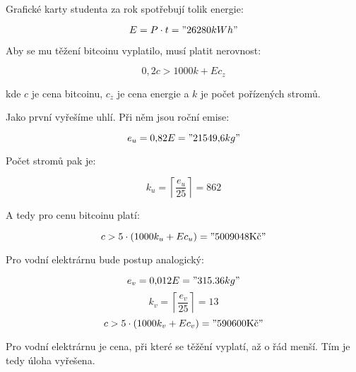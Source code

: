 \documentclass{fkssolpub}
\author{Ondřej Sedláček}
\begin{document}
Grafické karty studenta za rok spotřebují tolik energie:

\[
	E = P \cdot t = "26280 kWh"
\]

Aby se mu těžení bitcoinu vyplatilo, musí platit nerovnost:

\[
	0{,}2 c > 1000 k + E c_z
\]

kde $c$ je cena bitcoinu, $c_z$ je cena energie a $k$ je počet pořízených stromů.

Jako první vyřešíme uhlí. Při něm jsou roční emise:

\[
	e_u = 0{,}82 E = "21549{,}6 kg"
\]

Počet stromů pak je:

\[
	k_u = \left\lceil \frac{e_u}{25} \right\rceil = 862
\]

A tedy pro cenu bitcoinu platí:

\[
	c > 5 \cdot (1000 k_u + E c_u) = "5009048 \text{Kč}"
\]

Pro vodní elektrárnu bude postup analogický:

\[
	e_v = 0{,}012 E = "315.36 kg"
\]
\[
	k_v = \left\lceil \frac{e_v}{25} \right\rceil = 13
\]
\[
	c > 5 \cdot (1000 k_v + E c_v) = "590600 \text{Kč}"
\]

Pro vodní elektrárnu je cena, při které se těžění vyplatí, až o řád menší. Tím je tedy úloha vyřešena.
\end{document}
